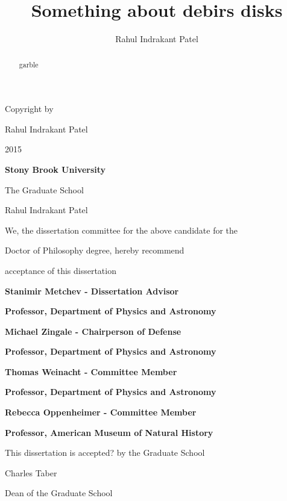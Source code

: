 \documentclass[phd,bottom,nosig]{usbthesis}
\author{Rahul Indrakant Patel}%
\title{Something about debirs disks}%
\begin{document}
\singlespacing %

\maketitle %


\newpage
{}

\vspace*{32\baselineskip}
\vspace*{1\baselineskip}
\centerline{Copyright by}
\centerline{Rahul Indrakant Patel}
\centerline{2015}


\newpage
{}
\setcounter{page}{2}

\centerline{\bf{Stony Brook University}}
\vspace*{1\baselineskip}
\centerline{The Graduate School}
\vspace*{2\baselineskip}
\centerline{Rahul Indrakant Patel}
\vspace*{2\baselineskip}
\centerline{We, the dissertation committee for the above candidate for the}
\vspace*{1\baselineskip}
\centerline{Doctor of Philosophy degree, hereby recommend}
\vspace*{1\baselineskip}
\centerline{acceptance of this dissertation}
\vspace*{2\baselineskip}
\centerline{\bf{Stanimir Metchev - Dissertation Advisor}}
\centerline{\bf{Professor, Department of Physics and Astronomy}}
\vspace*{1\baselineskip}
\centerline{\bf{Michael Zingale - Chairperson of Defense}}
\centerline{\bf{Professor, Department of Physics and Astronomy}}
\vspace*{1\baselineskip}
\centerline{\bf{Thomas Weinacht - Committee Member}}
\centerline{\bf{Professor, Department of Physics and Astronomy}}
\vspace*{1\baselineskip}
\centerline{\bf{Rebecca Oppenheimer - Committee Member}}
\centerline{\bf{Professor, American Museum of Natural History}}
\vspace*{2\baselineskip}
\centerline{This dissertation is accepted? by the Graduate School}
\vspace*{3\baselineskip}
\centerline{Charles Taber}
\centerline{Dean of the Graduate School}

\newpage

\begin{abstract}
    garble%
\end{abstract}
\end{document}
